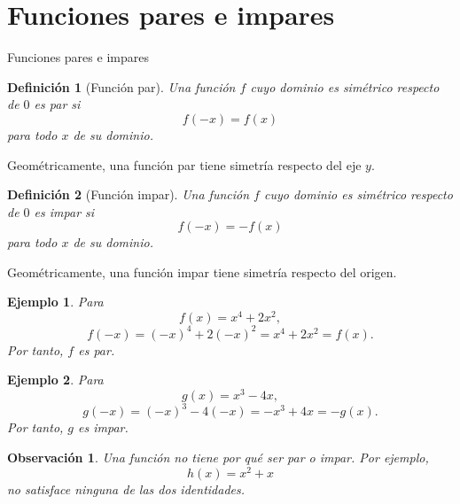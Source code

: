 \documentclass[aspectratio=169,10pt]{beamer}
\newtheorem{definicion}{Definición}
\newtheorem{observacion}{Observación}
\newtheorem{ejemplo}{Ejemplo}
\begin{document}
\section{Funciones pares e impares}
\begin{frame}{Funciones pares e impares}
\begin{definicion}[Función par]
Una función $f$ cuyo dominio es simétrico respecto de $0$ es \emph{par} si
\[
f(-x)=f(x)
\]
para todo $x$ de su dominio.
\end{definicion}

Geométricamente, una función par tiene simetría respecto del eje $y$.

\begin{definicion}[Función impar]
Una función $f$ cuyo dominio es simétrico respecto de $0$ es \emph{impar} si
\[
f(-x)=-f(x)
\]
para todo $x$ de su dominio.
\end{definicion}

Geométricamente, una función impar tiene simetría respecto del origen.

\begin{ejemplo}
Para
\[
f(x)=x^4+2x^2,
\]
\[
f(-x)=(-x)^4+2(-x)^2=x^4+2x^2=f(x).
\]
Por tanto, $f$ es par.
\end{ejemplo}

\begin{ejemplo}
Para
\[
g(x)=x^3-4x,
\]
\[
g(-x)=(-x)^3-4(-x)=-x^3+4x=-g(x).
\]
Por tanto, $g$ es impar.
\end{ejemplo}

\begin{observacion}
Una función no tiene por qué ser par o impar. Por ejemplo,
\[
h(x)=x^2+x
\]
no satisface ninguna de las dos identidades.
\end{observacion}

\end{frame}
\end{document}
